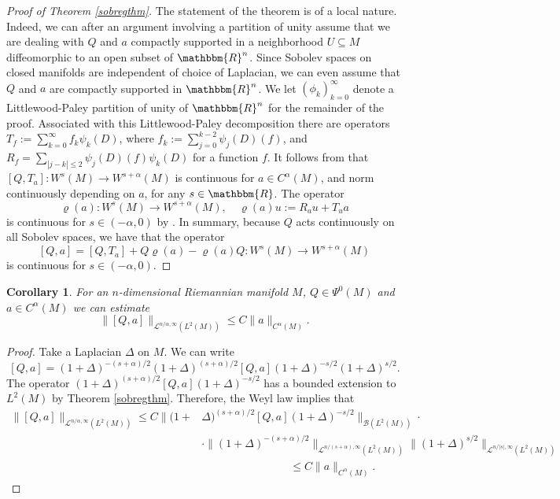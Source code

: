 \documentclass[10pt]{amsart}
\newtheorem{cor}[thm]{Corollary}
\theoremstyle{remark}
\theoremstyle{definition}
\begin{document}
\begin{proof}[Proof of Theorem \ref{sobregthm}]
The statement of the theorem is of a local nature. Indeed, we can after an argument involving a partition of unity assume that we are dealing with $Q$ and $a$ compactly supported in a neighborhood $U\subseteq M$ diffeomorphic to an open subset of ${\mathbbm{R}}^n$. Since Sobolev spaces on closed manifolds are independent of choice of Laplacian, we can even assume that $Q$ and $a$ are compactly supported in ${\mathbbm{R}}^n$. We let $(\phi_k)_{k=0}^\infty$ denote a Littlewood-Paley partition of unity of ${\mathbbm{R}}^n$ for the remainder of the proof. Associated with this Littlewood-Paley decomposition there are operators $T_f:=\sum_{k=0}^\infty f_k\psi_k(D)$,  where $f_k:=\sum_{j=0}^{k-2} \psi_j(D)(f)$, and $R_f=\sum_{|j-k|\leq 2} \psi_j(D)(f)\psi_k(D)$ for a function $f$. It follows from \cite[Proposition 7.3, Chapter I]{toolspde} that $[Q,T_a]:W^s(M)\to W^{s+\alpha}(M)$ is continuous for $a\in C^\alpha(M)$, and norm continuously depending on $a$, for any $s\in {\mathbbm{R}}$. The operator
$$\varrho(a):W^s(M)\to W^{s+\alpha}(M), \quad\varrho(a)u:=R_au+T_ua$$
is continuous for $s\in (-\alpha,0)$ by \cite[Proposition 3.2.A]{nlin}. In summary, because $Q$ acts continuously on all Sobolev spaces, we have that the operator
$$[Q,a]=[Q,T_a]+Q\varrho(a)-\varrho(a)Q:W^s(M)\to W^{s+\alpha}(M)$$
is continuous for $s\in (-\alpha,0)$.
\end{proof}

\begin{cor}
\label{weakest}
For an $n$-dimensional Riemannian manifold $M$, $Q\in \Psi^0(M)$ and $a\in C^\alpha(M)$ we can estimate
\[\|[Q,a]\|_{\mathcal{L}^{n/\alpha,\infty}(L^2(M))}\leq C\|a\|_{C^\alpha(M)}.\]
\end{cor}

\begin{proof}
Take a Laplacian $\Delta$ on $M$. We can write 
$$[Q,a]=(1+\Delta)^{-(s+\alpha)/2}(1+\Delta)^{(s+\alpha)/2}[Q,a](1+\Delta)^{-s/2}(1+\Delta)^{s/2}.$$
The operator $(1+\Delta)^{(s+\alpha)/2}[Q,a](1+\Delta)^{-s/2}$ has a bounded extension to $L^2(M)$ by Theorem \ref{sobregthm}. Therefore, the Weyl law implies that
\begin{align*}
\|[Q,a]\|_{\mathcal{L}^{n/\alpha,\infty}(L^2(M))}\leq C\|(1+&\Delta)^{(s+\alpha)/2}[Q,a](1+\Delta)^{-s/2}\|_{{\mathcal{B}}(L^2(M))}\cdot\\
&\cdot\|(1+\Delta)^{-(s+\alpha)/2}\|_{\mathcal{L}^{n/(s+\alpha),\infty}(L^2(M))}\|(1+\Delta)^{s/2}\|_{\mathcal{L}^{n/|s|,\infty}(L^2(M))}\\
&\qquad\qquad\qquad\qquad\leq C\|a\|_{C^\alpha(M)}.
\end{align*}
\end{proof}
\end{document}
